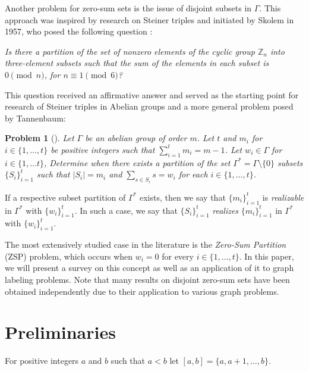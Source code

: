 \documentclass{article}
\newtheorem{prob}[thm]{Problem}
\begin{document}
Another problem for zero-sum sets is the issue of disjoint subsets in $\Gamma$. This approach was inspired by research on Steiner triples and initiated by Skolem in 1957, who posed the following question \cite{Skolem57}:

\textit{
Is there a partition of the set of nonzero elements of the cyclic group $\mathbb{Z}_n$   into three-element subsets such that the sum of the elements in each subset is $0\pmod n$, for $n\equiv 1\pmod 6$?
}

This question received an affirmative answer \cite{ref_Han, Skolem57, Skolem58} and served as the starting point for research of Steiner triples in Abelian groups \cite{Tannenbaum3} and a more general problem posed by Tannenbaum:
\begin{prob}[\cite{Tannenbaum1}]\label{problemT}
Let $\Gamma$ be an abelian group of order $m$. Let 
$t$ and $m_i$ for $i\in\{1,\ldots,t\}$ be positive integers such that $\sum_{i=1}^t m_i = m - 1$. Let  $w_i\in\Gamma$ for $i \in \{1,\ldots t\}$, Determine when there exists a partition of the set  $\Gamma^*=\Gamma\setminus\{0\}$ subsets $\{S_i\}_{i=1}^t$   such that $|S_i| = m_i$ and $\sum_{s\in S_i}s = w_i$   for each $i\in\{1,\ldots,t\}$. 
\end{prob}
If a respective subset partition of $\Gamma^*$ exists, then we say that $\{m_i\}_{i=1}^t$ is \textit{realizable} in $\Gamma^*$ with $\{w_i\}_{i=1}^{t}$. In such a case, we say that $\{S_i\}_{i=1}^t$ \textit{realizes} $\{m_i\}_{i=1}^t$ in $\Gamma^*$ with $\{w_i\}_{i=1}^{t}$. %

The most extensively studied case in the literature is the \textit{Zero-Sum Partition} (ZSP) problem, which occurs when 
$w_i=0$ for every  {$i\in\{1,\ldots,t\}$}. In this paper, we will present a survey on this concept as well as an application of it to graph labeling problems. Note that many results on disjoint zero-sum sets have been obtained independently due to their application to various graph problems.

  \section{Preliminaries}
For positive integers $a$ and $b$ such that $a<b$ let $[a,b]=\{a,a+1,\ldots,b\}$.
\end{document}
